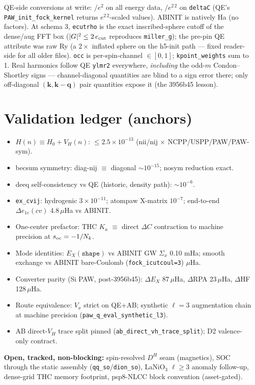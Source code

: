 \documentclass[11pt]{article}
\newcommand{\code}[1]{\texttt{#1}}
\begin{document}
\noindent QE-side conversions at write: $/e^2$ on all energy data,
$/e^{2\,2}$ on \code{deltaC} (QE's \code{PAW\_init\_fock\_kernel} returns
$e^{2\,2}$-scaled values). ABINIT is natively Ha (no factors).
At schema 3, \code{ecutrho} is the exact inscribed-sphere cutoff of the
dense/aug FFT box ($|G|^2 \le 2\,e_{\rm cut}$ reproduces \code{miller\_g});
the pre-pin QE attribute was raw Ry (a $2\times$ inflated sphere on the
h5-init path --- fixed reader-side for all older files). \code{occ} is
per-spin-channel $\in[0,1]$; \code{kpoint\_weights} sum to 1. Real
harmonics follow QE \code{ylmr2} everywhere, \emph{including} the odd-$m$
Condon--Shortley signs --- channel-diagonal quantities are blind to a sign
error there; only off-diagonal $(\mathbf k,\mathbf k{-}\mathbf q)$ pair
quantities expose it (the 3956b45 lesson).

\section{Validation ledger (anchors)}
\label{sec:validation}

\begin{itemize}[leftmargin=1.6em,itemsep=2pt]
\item $H(n)\equiv H_0+V_H(n)$: $\le 2.5\times10^{-13}$
(nii/nij $\times$ NCPP/USPP/PAW/PAW-sym).
\item becsum symmetry: diag-nij $\equiv$ diagonal $\sim 10^{-15}$;
nosym reduction exact.
\item deeq self-consistency vs QE (historic, density path):
$\sim 10^{-6}$.
\item \code{ex\_cvij}: hydrogenic $3\times10^{-11}$; atompaw X-matrix
$10^{-7}$; end-to-end $\Delta e_{1e}(cv)$ 4.8\,$\mu$Ha vs ABINIT.
\item One-center prefactor: THC $K_a$ $\equiv$ direct $\Delta C$
contraction to machine precision at $s_{\rm oc}=-1/N_k$.
\item Mode identities: $E_X(\code{shape})$ vs ABINIT GW $\Sigma_x$
0.10 mHa; smooth exchange vs ABINIT bare-Coulomb (\code{fock\_icutcoul=3})
$\mu$Ha.
\item Converter parity (Si PAW, post-3956b45): $\Delta E_X$ 87\,$\mu$Ha,
$\Delta$RPA 23\,$\mu$Ha, $\Delta$HF 128\,$\mu$Ha.
\item Route equivalence: $V_x$ strict on QE+AB; synthetic $\ell=3$
augmentation chain at machine precision
(\code{paw\_q\_eval\_synthetic\_l3}).
\item AB direct-$V_H$ trace split pinned
(\code{ab\_direct\_vh\_trace\_split}); D2 valence-only contract.
\end{itemize}

\medskip
\noindent\textbf{Open, tracked, non-blocking:} spin-resolved $D^H$ seam
(magnetics), SOC through the static assembly
(\code{qq\_so}/\code{dion\_so}), LaNiO$_3$ $\ell\ge3$ anomaly follow-up,
dense-grid THC memory footprint, psp8-NLCC block convention
(asset-gated).
\end{document}
